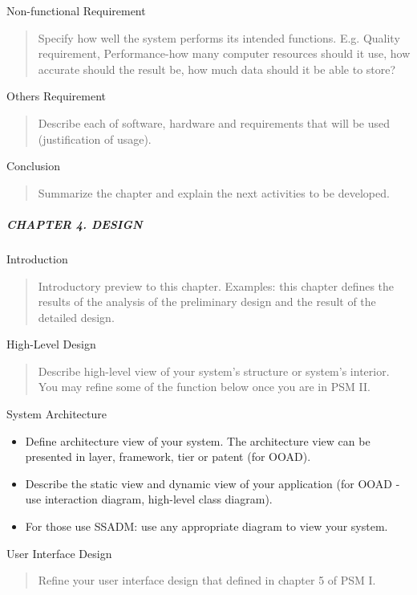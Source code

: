 \documentclass[12pt,a4paper]{article}
\begin{document}
Non-functional Requirement

\begin{quote}
Specify how well the system performs its intended functions. E.g.
Quality requirement, Performance-how many computer resources should it
use, how accurate should the result be, how much data should it be able
to store?
\end{quote}

Others Requirement

\begin{quote}
Describe each of software, hardware and requirements that will be used
(justification of usage).
\end{quote}

Conclusion

\begin{quote}
Summarize the chapter and explain the next activities to be developed.
\end{quote}

\subparagraph{CHAPTER 4. DESIGN}\label{chapter-4.-design}

Introduction

\begin{quote}
Introductory preview to this chapter. Examples: this chapter defines the
results of the analysis of the preliminary design and the result of the
detailed design.
\end{quote}

High-Level Design

\begin{quote}
Describe high-level view of your system's structure or system's
interior. You may refine some of the function below once you are in PSM
II.
\end{quote}

System Architecture

\begin{itemize}
\item
  Define architecture view of your system. The architecture view can be
  presented in layer, framework, tier or patent (for OOAD).
\item
  Describe the static view and dynamic view of your application (for
  OOAD - use interaction diagram, high-level class diagram).
\item
  For those use SSADM: use any appropriate diagram to view your system.
\end{itemize}

User Interface Design

\begin{quote}
Refine your user interface design that defined in chapter 5 of PSM I.
\end{quote}
\end{document}
